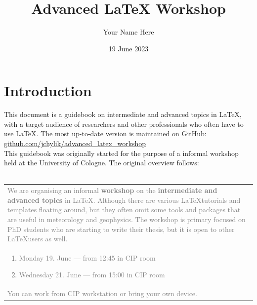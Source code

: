 \documentclass[a4paper,10pt]{report} %
\title{Advanced LaTeX Workshop}
\author{Your Name Here}
\date{19 June 2023}
\begin{document}

\maketitle

 \pagestyle{fancy}

 \section*{Introduction} 
 
 This document is a guidebook on intermediate and advanced topics in \LaTeX, with a target audience of researchers and other professionals who often have to use \LaTeX. The most up-to-date version is maintained on GitHub: \href{https://github.com/jchylik/advanced_latex_workshop}{github.com/jchylik/advanced\_latex\_workshop} \\
 
 
 This guidebook was originally started for the purpose of a informal workshop held at the University of Cologne. 
 The original overview follows: 
 \\~\vspace{5ex}
 
\begin{tabular}{|p{}}
 \textcolor{gray}{
 We are organising an informal \textbf{workshop} on the \textbf{intermediate and advanced topics} in \LaTeX.
Although there are various \LaTeX tutorials and templates floating around, but they often omit some tools and packages that are useful in meteorology and geophysics. The workshop is primary focused on PhD students who are starting to write their thesis, but it is open to other \LaTeX users as well.}
\\
 \begin{enumerate}
 \item   \textcolor{gray}{Monday 19. June --- from 12:45 in CIP room}
 \item   \textcolor{gray}{Wednesday 21. June --- from 15:00 in CIP room} 
\end{enumerate}\\


\noindent
 \textcolor{gray}{ You can work from CIP workstation or bring your own device.}~\vspace{3ex}\\
\end{tabular}
 
\end{document}
